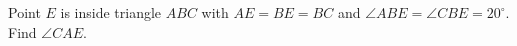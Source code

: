 Point $E$ is inside triangle $ABC$ with $AE=BE=BC$ and $\angle ABE=\angle CBE=20^\circ$. Find $\angle CAE$.
